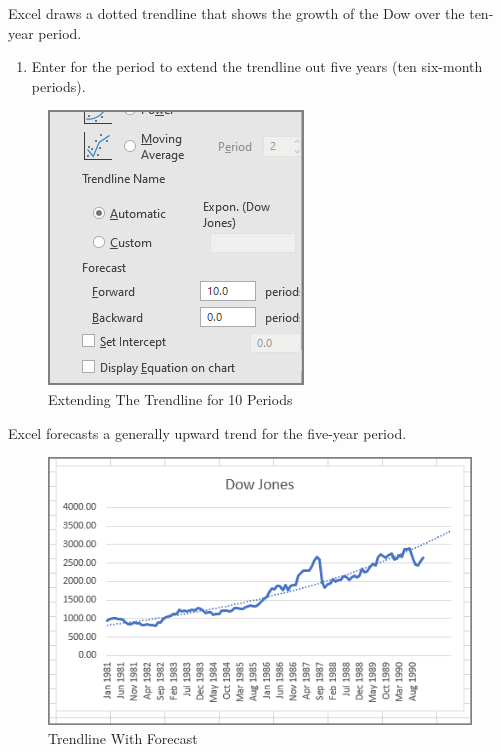 Excel draws a dotted trendline that shows the growth of the Dow over the ten-year period.

\begin{enumerate}[resume]
	\item Enter  for the  period to extend the trendline out five years (ten six-month periods).
\end{enumerate}

\begin{figure}[H]
	\centering
	\includegraphics[width=\maxwidth{.95\linewidth}]{gfx/ch08_fig10}
	\caption{Extending The Trendline for 10 Periods}
	\label{08:fig10}
\end{figure}

Excel forecasts a generally upward trend for the five-year period.

\begin{figure}[H]
	\centering
	\includegraphics[width=\maxwidth{.95\linewidth}]{gfx/ch08_fig11}
	\caption{Trendline With Forecast}
	\label{08:fig11}
\end{figure}

